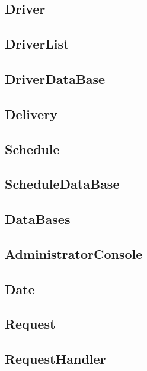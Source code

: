 \subsection{Driver}
\subsection{DriverList}
\subsection{DriverDataBase}
\subsection{Delivery}
\subsection{Schedule}
\subsection{ScheduleDataBase}
\subsection{DataBases}
\subsection{AdministratorConsole}
\subsection{Date}
\subsection{Request}
\subsection{RequestHandler}

